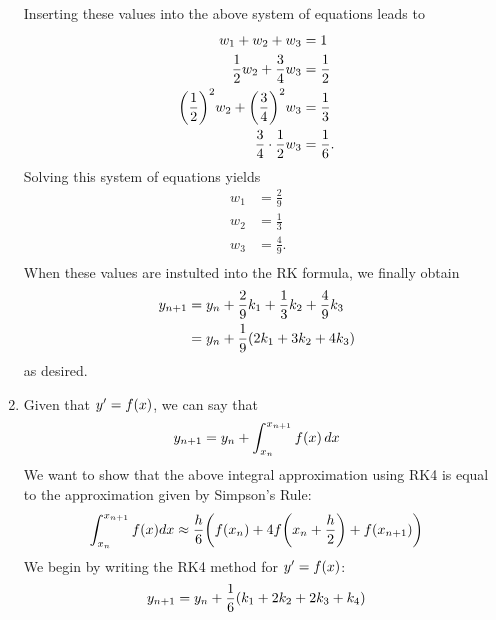 \documentclass[12pt]{article}
\DeclarePairedDelimiter\rb{(}{)}
\begin{document}
\begin{enumerate}[label=(\alph*)]
        Inserting these values into the above system of equations leads to
        \begin{align*}
            w_{1} + w_{2} + w_{3} & = 1 &\\
            \frac{1}{2} w_{2} + \frac{3}{4} w_{3} & =  \frac{1}{2} &\\
            \rb*{\frac{1}{2}}^{2} w_{2} + \rb*{\frac{3}{4}}^{2} w_{3} & =  \frac{1}{3} &\\
            \frac{3}{4} \cdot \frac{1}{2} w_{3} & =  \frac{1}{6}. &\\
        \end{align*}
        Solving this system of equations yields
        \begin{align*}
            w_{1} & =  \frac{2}{9} &\\
            w_{2} & =  \frac{1}{3} &\\
            w_{3} & =  \frac{4}{9}. &\\
        \end{align*}
        When these values are instulted into the RK formula, we finally obtain
        \begin{align*}
            y_{n+1} & =  y_{n} + \frac{2}{9} k_{1} + \frac{1}{3} k_{2} + \frac{4}{9} k_{3} &\\
            & =  y_{n} + \frac{1}{9} \rb*{ 2 k_{1} + 3 k_{2} + 4 k_{3}} &\\
        \end{align*}
        as desired.
    \item 
        Given that \(y' = f \rb*{x}\), we can say that 
        \begin{align*}
            y_{n+1 } & =  y_{n} + \int_{x_{n}}^{x_{n+1}} { f \rb*{x}} \,d x &\\
        \end{align*}
        We want to show that the above integral approximation using RK4 is equal to the approximation given by Simpson's Rule:
        \begin{align*}
            \int_{x_{n}}^{x_{n+1}} f \rb*{x} dx & \approx
            {\frac{h}{6}
            \rb*{ f \rb*{x_{n}} + 4 f \rb*{x_{n} + \frac{h}{2}} + 
        f \rb*{ x_{n+1}}}} &\\
        \end{align*}
        We begin by writing the RK4 method for \(y' = f \rb*{x}\):
        \begin{align*}
            y_{n+1} & =  y_{n} + \frac{1}{6} \rb*{
                k_{1} + 2 k_{2} + 2 k_{3} + k_{4}
            }
        \end{align*}

\end{enumerate}
\end{document}
